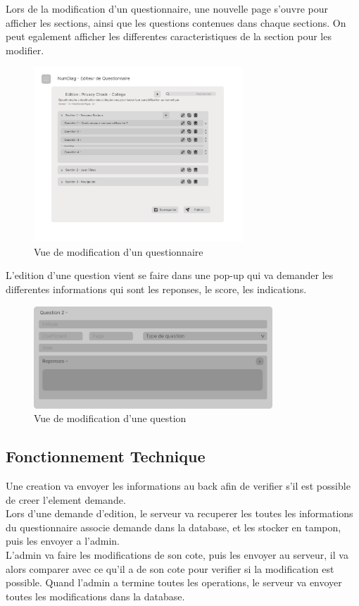 \documentclass{extarticle}
\begin{document}
Lors de la modification d'un questionnaire, une nouvelle page s'ouvre pour afficher les sections, ainsi que les questions contenues dans chaque sections. On peut egalement afficher les differentes caracteristiques de la section pour les modifier.

\begin{figure}[h]
    \centering
    \includegraphics[width=0.7\textwidth]{questionnaireVue.png}
    \caption{Vue de modification d'un questionnaire}
    \label{fig:EditQuestionnaire}
\end{figure}

L'edition d'une question vient se faire dans une pop-up qui va demander les differentes informations qui sont les reponses, le score, les indications.

\begin{figure}[h]
    \centering
    \includegraphics[width=0.8\textwidth]{questionVue.png}
    \caption{Vue de modification d'une question}
    \label{fig:EditQuestionnaire}
\end{figure}

\subsection{Fonctionnement Technique}
Une creation va envoyer les informations au back afin de verifier s'il est possible de creer l'element demande.\\
Lors d'une demande d'edition, le serveur va recuperer les toutes les informations du questionnaire associe demande dans la database, et les stocker en tampon, puis les envoyer a l'admin.\\
L'admin va faire les modifications de son cote, puis les envoyer au serveur, il va alors comparer avec ce qu'il a de son cote pour verifier si la modification est possible.
Quand l'admin a termine toutes les operations, le serveur va envoyer toutes les modifications dans la database.
\end{document}
